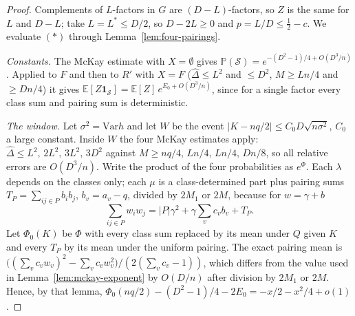 \documentclass[11pt]{article}
\newcommand{\EE}{\mathbb{E}}
\newcommand{\PP}{\mathbb{P}}
\newcommand{\Var}{\mathrm{Var}}
\begin{document}
\begin{proof}
Complements of \(L\)-factors in \(G\) are \((D-L)\)-factors, so \(Z\) is the
same for \(L\) and \(D-L\); take \(L=L^*\le D/2\), so \(D-2L\ge0\) and
\(p=L/D\le\tfrac12-c\). We evaluate \((\ast)\) through
Lemma~\ref{lem:four-pairings}.

\emph{Constants.} The McKay estimate with \(X=\emptyset\) gives
\(\PP(\mathcal S)=e^{-(D^2-1)/4+O(D^3/n)}\). Applied to \(F\) and then to
\(R'\) with \(X=F\) (\(\hat\Delta\le L^2\) and \(\le D^2\), \(M\ge Ln/4\) and
\(\ge Dn/4\)) it gives \(\EE[Z\mathbf 1_{\mathcal S}]=\EE[Z]\,e^{E_0+O(D^3/n)}\),
since for a single factor every class sum and pairing sum is deterministic.

\emph{The window.} Let \(\sigma^2=\Var h\) and let \(W\) be the event
\(\lvert K-nq/2\rvert\le C_0D\sqrt{n\sigma^2}\), \(C_0\) a large constant.
Inside \(W\) the four McKay estimates apply:
\(\hat\Delta\le L^2,\,2L^2,\,3L^2,\,3D^2\) against
\(M\ge nq/4,\,Ln/4,\,Ln/4,\,Dn/8\), so all relative errors are
\(O(D^3/n)\). Write the product of the four probabilities as \(e^{\Phi}\).
Each \(\lambda\) depends on the classes only; each \(\mu\) is a
class-determined part plus pairing sums \(T_P=\sum_{ij\in P}b_ib_j\),
\(b_v=a_v-q\), divided by \(2M_1\) or \(2M\), because for \(w=\gamma+b\)
\[
\sum_{ij\in P}w_iw_j=\lvert P\rvert\gamma^2+\gamma\sum_v c_vb_v+T_P .
\]
Let \(\Phi_0(K)\) be \(\Phi\) with every class sum replaced by its mean
under \(Q\) given \(K\) and every \(T_P\) by its mean under the uniform
pairing. The exact pairing mean is
\(\bigl((\sum_vc_vw_v)^2-\sum_vc_vw_v^2\bigr)/(2(\sum_vc_v-1))\), which
differs from the value used in Lemma~\ref{lem:mckay-exponent} by
\(O(D/n)\) after division by \(2M_1\) or \(2M\). Hence, by that lemma,
\(\Phi_0(nq/2)-(D^2-1)/4-2E_0=-x/2-x^2/4+o(1)\).


\end{proof}
\end{document}
